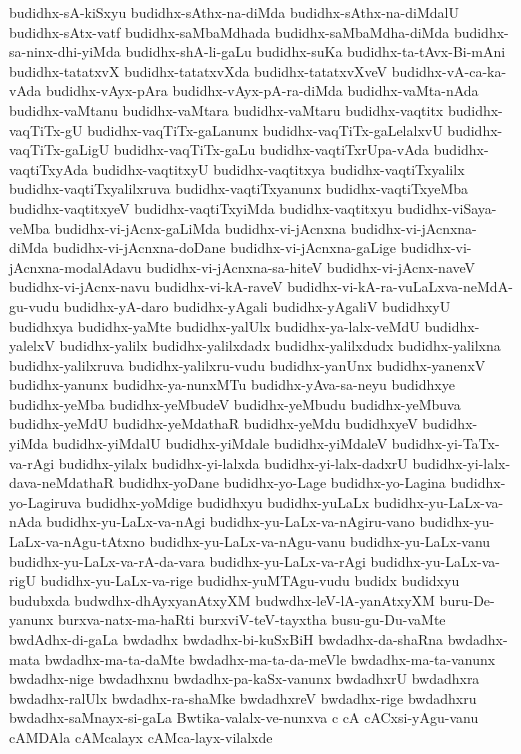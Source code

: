 {budidhx-sA-kiSxyu
budidhx-sAthx-na-diMda
budidhx-sAthx-na-diMdalU
budidhx-sAtx-vatf
budidhx-saMbaMdhada
budidhx-saMbaMdha-diMda
budidhx-sa-ninx-dhi-yiMda
budidhx-shA-li-gaLu
budidhx-suKa
budidhx-ta-tAvx-Bi-mAni
budidhx-tatatxvX
budidhx-tatatxvXda
budidhx-tatatxvXveV
budidhx-vA-ca-ka-vAda
budidhx-vAyx-pAra
budidhx-vAyx-pA-ra-diMda
budidhx-vaMta-nAda
budidhx-vaMtanu
budidhx-vaMtara
budidhx-vaMtaru
budidhx-vaqtitx
budidhx-vaqTiTx-gU
budidhx-vaqTiTx-gaLanunx
budidhx-vaqTiTx-gaLelalxvU
budidhx-vaqTiTx-gaLigU
budidhx-vaqTiTx-gaLu
budidhx-vaqtiTxrUpa-vAda
budidhx-vaqtiTxyAda
budidhx-vaqtitxyU
budidhx-vaqtitxya
budidhx-vaqtiTxyalilx
budidhx-vaqtiTxyalilxruva
budidhx-vaqtiTxyanunx
budidhx-vaqtiTxyeMba
budidhx-vaqtitxyeV
budidhx-vaqtiTxyiMda
budidhx-vaqtitxyu
budidhx-viSaya-veMba
budidhx-vi-jAcnx-gaLiMda
budidhx-vi-jAcnxna
budidhx-vi-jAcnxna-diMda
budidhx-vi-jAcnxna-doDane
budidhx-vi-jAcnxna-gaLige
budidhx-vi-jAcnxna-modalAdavu
budidhx-vi-jAcnxna-sa-hiteV
budidhx-vi-jAcnx-naveV
budidhx-vi-jAcnx-navu
budidhx-vi-kA-raveV
budidhx-vi-kA-ra-vuLaLxva-neMdA-gu-vudu
budidhx-yA-daro
budidhx-yAgali
budidhx-yAgaliV
budidhxyU
budidhxya
budidhx-yaMte
budidhx-yalUlx
budidhx-ya-lalx-veMdU
budidhx-yalelxV
budidhx-yalilx
budidhx-yalilxdadx
budidhx-yalilxdudx
budidhx-yalilxna
budidhx-yalilxruva
budidhx-yalilxru-vudu
budidhx-yanUnx
budidhx-yanenxV
budidhx-yanunx
budidhx-ya-nunxMTu
budidhx-yAva-sa-neyu
budidhxye
budidhx-yeMba
budidhx-yeMbudeV
budidhx-yeMbudu
budidhx-yeMbuva
budidhx-yeMdU
budidhx-yeMdathaR
budidhx-yeMdu
budidhxyeV
budidhx-yiMda
budidhx-yiMdalU
budidhx-yiMdale
budidhx-yiMdaleV
budidhx-yi-TaTx-va-rAgi
budidhx-yilalx
budidhx-yi-lalxda
budidhx-yi-lalx-dadxrU
budidhx-yi-lalx-dava-neMdathaR
budidhx-yoDane
budidhx-yo-Lage
budidhx-yo-Lagina
budidhx-yo-Lagiruva
budidhx-yoMdige
budidhxyu
budidhx-yuLaLx
budidhx-yu-LaLx-va-nAda
budidhx-yu-LaLx-va-nAgi
budidhx-yu-LaLx-va-nAgiru-vano
budidhx-yu-LaLx-va-nAgu-tAtxno
budidhx-yu-LaLx-va-nAgu-vanu
budidhx-yu-LaLx-vanu
budidhx-yu-LaLx-va-rA-da-vara
budidhx-yu-LaLx-va-rAgi
budidhx-yu-LaLx-va-rigU
budidhx-yu-LaLx-va-rige
budidhx-yuMTAgu-vudu
budidx
budidxyu
budubxda
budwdhx-dhAyxyanAtxyXM
budwdhx-leV-lA-yanAtxyXM
buru-De-yanunx
burxva-natx-ma-haRti
burxviV-teV-tayxtha
busu-gu-Du-vaMte
bwdAdhx-di-gaLa
bwdadhx
bwdadhx-bi-kuSxBiH
bwdadhx-da-shaRna
bwdadhx-mata
bwdadhx-ma-ta-daMte
bwdadhx-ma-ta-da-meVle
bwdadhx-ma-ta-vanunx
bwdadhx-nige
bwdadhxnu
bwdadhx-pa-kaSx-vanunx
bwdadhxrU
bwdadhxra
bwdadhx-ralUlx
bwdadhx-ra-shaMke
bwdadhxreV
bwdadhx-rige
bwdadhxru
bwdadhx-saMnayx-si-gaLa
Bwtika-valalx-ve-nunxva
c
cA
cACxsi-yAgu-vanu
cAMDAla
cAMcalayx
cAMca-layx-vilalxde
}
